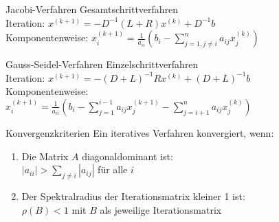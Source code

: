 \begin{concept}{Jacobi-Verfahren}
Gesamtschrittverfahren 
\vspace{1mm}\\
Iteration: $x^{(k+1)} = -D^{-1}(L + R)x^{(k)} + D^{-1}b$
\vspace{1mm}\\
Komponentenweise:
$x_i^{(k+1)} = \frac{1}{a_{ii}}\left(b_i - \sum_{j=1,j\neq i}^n a_{ij}x_j^{(k)}\right)$
\end{concept}

\begin{concept}{Gauss-Seidel-Verfahren}
Einzelschrittverfahren 
\vspace{1mm}\\
Iteration: $x^{(k+1)} = -(D+L)^{-1}Rx^{(k)} + (D+L)^{-1}b$
\vspace{1mm}\\
Komponentenweise:\\
$x_i^{(k+1)} = \frac{1}{a_{ii}}\left(b_i - \sum_{j=1}^{i-1} a_{ij}x_j^{(k+1)} - \sum_{j=i+1}^n a_{ij}x_j^{(k)}\right)$
\end{concept}

\begin{theorem}{Konvergenzkriterien}
Ein iteratives Verfahren konvergiert, wenn:
\begin{enumerate}
    \item Die Matrix $A$ diagonaldominant ist:\\
    $|a_{ii}| > \sum_{j\neq i} |a_{ij}|$ für alle $i$
    \item Der Spektralradius der Iterationsmatrix kleiner 1 ist:\\
    $\rho(B) < 1$ mit $B$ als jeweilige Iterationsmatrix
\end{enumerate}
\end{theorem}

